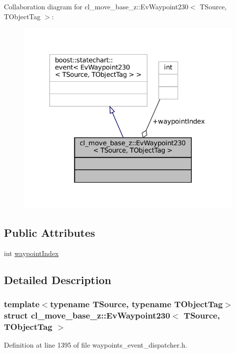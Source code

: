 Collaboration diagram for cl\+\_\+move\+\_\+base\+\_\+z\+:\+:Ev\+Waypoint230$<$ T\+Source, T\+Object\+Tag $>$\+:
\nopagebreak
\begin{figure}[H]
\begin{center}
\leavevmode
\includegraphics[width=319pt]{structcl__move__base__z_1_1EvWaypoint230__coll__graph}
\end{center}
\end{figure}
\subsection*{Public Attributes}
\begin{DoxyCompactItemize}
\item 
int \hyperlink{structcl__move__base__z_1_1EvWaypoint230_a1c20426dc5265703bf9d973174c28565}{waypoint\+Index}
\end{DoxyCompactItemize}


\subsection{Detailed Description}
\subsubsection*{template$<$typename T\+Source, typename T\+Object\+Tag$>$\newline
struct cl\+\_\+move\+\_\+base\+\_\+z\+::\+Ev\+Waypoint230$<$ T\+Source, T\+Object\+Tag $>$}



Definition at line 1395 of file waypoints\+\_\+event\+\_\+dispatcher.\+h.



